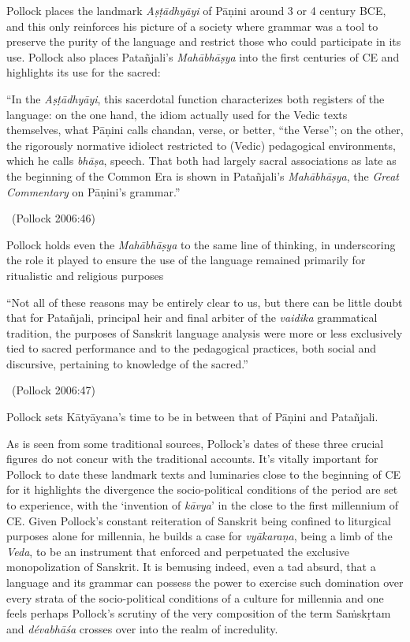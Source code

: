 Pollock places the landmark \textit{Aṣṭādhyāyi} of Pāṇini around 3 or 4 century BCE, and this only reinforces his picture of a society where grammar was a tool to preserve the purity of the language and restrict those who could participate in its use. Pollock also places Patañjali’s \textit{Mahābhāṣya} into the first centuries of CE and highlights its use for the sacred:

\begin{myquote}
“In the \textit{Aṣṭādhyāyi}, this sacerdotal function characterizes both registers of the language: on the one hand, the idiom actually used for the Vedic texts themselves, what Pāṇini calls chandan, verse, or better, “the Verse”; on the other, the rigorously normative idiolect restricted to (Vedic) pedagogical environments, which he calls \textit{bhāṣa}, speech. That both had largely sacral associations as late as the beginning of the Common Era is shown in Patañjali’s \textit{Mahābhāṣya}, the \textit{Great Commentary} on Pāṇini’s grammar.” 

~\hfill (Pollock 2006:46)
\end{myquote}

Pollock holds even the \textit{Mahābhāṣya} to the same line of thinking, in underscoring the role it played to ensure the use of the language remained primarily for ritualistic and religious purposes

\begin{myquote}
“Not all of these reasons may be entirely clear to us, but there can be little doubt that for Patañjali, principal heir and final arbiter of the \textit{vaidika} grammatical tradition, the purposes of Sanskrit language analysis were more or less exclusively tied to sacred performance and to the pedagogical practices, both social and discursive, pertaining to knowledge of the sacred.” 

~\hfill (Pollock 2006:47)
\end{myquote}

Pollock sets Kātyāyana’s time to be in between that of Pāṇini and Patañjali.

As is seen from some traditional sources, Pollock’s dates of these three crucial figures do not concur with the traditional accounts. It’s vitally important for Pollock to date these landmark texts and luminaries close to the beginning of CE for it highlights the divergence the socio-political conditions of the period are set to experience, with the ‘invention of \textit{kāvya}’ in the close to the first millennium of CE. Given Pollock’s constant reiteration of Sanskrit being confined to liturgical purposes alone for millennia, he builds a case for \textit{vyākaraṇa}, being a limb of the \textit{Veda}, to be an instrument that enforced and perpetuated the exclusive monopolization of Sanskrit. It is bemusing indeed, even a tad absurd, that a language and its grammar can possess the power to exercise such domination over every strata of the socio-political conditions of a culture for millennia and one feels perhaps Pollock’s scrutiny of the very composition of the term Saṁskṛtam and \textit{dévabhāśa} crosses over into the realm of incredulity.

